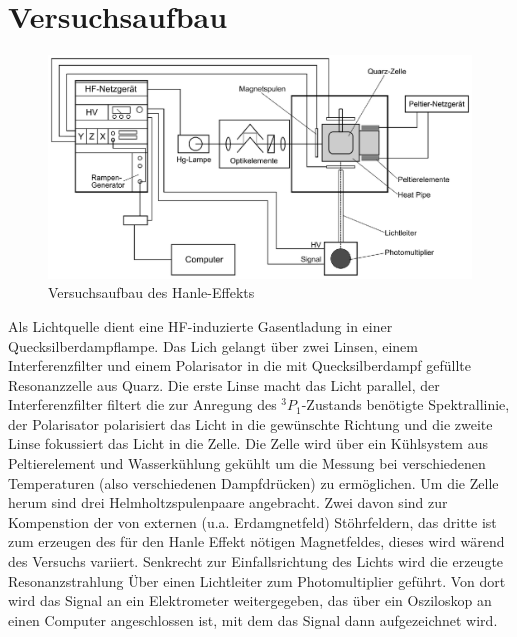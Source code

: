 \documentclass[12pt]{article}
\begin{document}
\section{Versuchsaufbau}
\begin{figure}[H]  
\centering
\includegraphics[width=0.7\linewidth]{pictures/Aufbau.ps}
\caption{Versuchsaufbau des Hanle-Effekts}
\end{figure}

Als Lichtquelle dient eine HF-induzierte Gasentladung in einer Quecksilberdampflampe. Das Lich gelangt über zwei Linsen, 
einem Interferenzfilter und einem Polarisator in die mit Quecksilberdampf gefüllte Resonanzzelle aus Quarz. Die erste Linse 
macht das Licht parallel, der Interferenzfilter filtert die zur Anregung des $^3P_1$-Zustands benötigte Spektrallinie, der 
Polarisator polarisiert das Licht in die gewünschte Richtung und die zweite Linse fokussiert das Licht in die Zelle. Die Zelle
wird über ein Kühlsystem aus Peltierelement und Wasserkühlung gekühlt um die Messung bei verschiedenen Temperaturen (also
verschiedenen Dampfdrücken) zu ermöglichen. Um die Zelle herum sind drei Helmholtzspulenpaare angebracht. Zwei davon sind
zur Kompenstion der von externen (u.a. Erdamgnetfeld) Stöhrfeldern, das dritte ist zum erzeugen des für den Hanle Effekt 
nötigen Magnetfeldes, dieses wird wärend des Versuchs variiert. Senkrecht zur Einfallsrichtung des Lichts wird die erzeugte
Resonanzstrahlung Über einen Lichtleiter zum Photomultiplier geführt. Von dort wird das Signal an ein Elektrometer
weitergegeben, das über ein Osziloskop an einen Computer angeschlossen ist, mit dem das Signal dann aufgezeichnet wird.
\newpage
\end{document}
